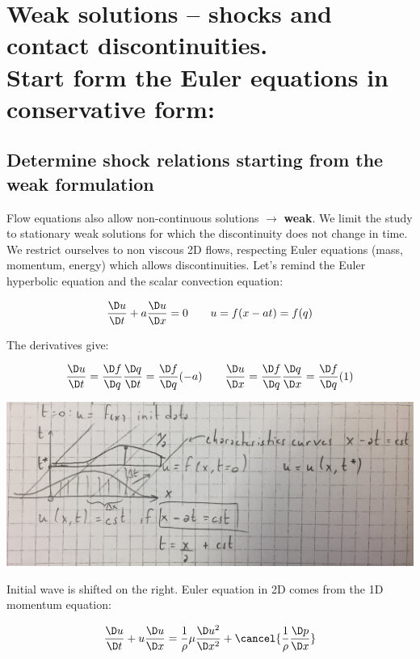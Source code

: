 \documentclass[british,french,11pt, a4paper, openany]{article}
\begin{document}
\section{Weak solutions – shocks and contact discontinuities.\\ Start form the Euler equations in conservative form:}
\subsection{Determine shock relations starting from the weak formulation}

Flow equations also allow non-continuous solutions $\rightarrow$ \textbf{weak}. We limit the study to stationary weak solutions for which the discontinuity does not change in time. We restrict ourselves to non viscous 2D flows, respecting Euler equations (mass, momentum, energy) which allows discontinuities. Let's remind the Euler hyperbolic equation and the scalar convection equation: 

\begin{equation}
\frac{\D u}{\D t} + a \frac{\D u}{\D x} = 0 \qquad u = f(x-at) = f(q)
\end{equation}

The derivatives give: 

\begin{equation}
\frac{\D u}{\D t} = \frac{\D f}{\D q} \frac{\D q}{\D t} = \frac{\D f}{\D q} (-a)\qquad \frac{\D u}{\D x} = \frac{\D f}{\D q} \frac{\D q}{\D x} = \frac{\D f}{\D q} (1)
\end{equation}

\begin{center}
	\includegraphics[scale=0.1]{ch8/7}
\end{center}

Initial wave is shifted on the right. Euler equation in 2D comes from the 1D momentum equation: 

\begin{equation}
\frac{\D u}{\D t} + u\frac{\D u}{\D x} = \frac{1}{\rho } \mu \frac{\D u^2}{\D  x^2} + \cancel{\frac{1}{\rho }\frac{\D p}{\D x}}
\end{equation}
\end{document}
